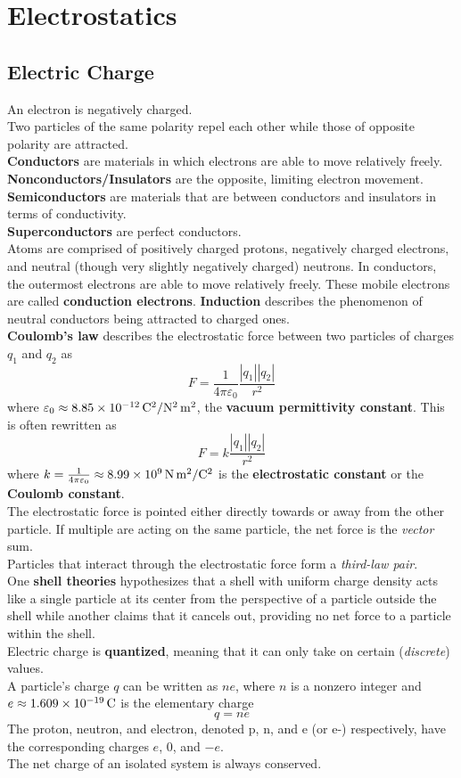 \documentclass[./Electricity and Magnetism.tex]{subfiles}
\begin{document}
	\section{Electrostatics}
		\subsection{Electric Charge}
			An electron is negatively charged. \\
			Two particles of the same polarity repel each other while those of opposite polarity are attracted. \\
			\textbf{Conductors} are materials in which electrons are able to move relatively freely. \textbf{Nonconductors/Insulators} are the opposite, limiting electron movement. \\
			\textbf{Semiconductors} are materials that are between conductors and insulators in terms of conductivity. \\
			\textbf{Superconductors} are perfect conductors. \\
			Atoms are comprised of positively charged protons, negatively charged electrons, and neutral (though very slightly negatively charged) neutrons. In conductors, the outermost electrons are able to move relatively freely. These mobile electrons are called \textbf{conduction electrons}.
			\textbf{Induction} describes the phenomenon of neutral conductors being attracted to charged ones. \\
			\textbf{Coulomb's law} describes the electrostatic force between two particles of charges \(q_1\) and \(q_2\) as
				\[F = \frac{1}{4\pi\varepsilon_0}\frac{|q_1||q_2|}{r^2} \tag{Coulomb's Law}\]
				where \(\varepsilon_0 \approx \SI[per-mode = fraction]{8.85d-12}{C^2/N^2.m^2}\), the \textbf{vacuum permittivity constant}. This is often rewritten as
				\[F = k\frac{|q_1||q_2|}{r^2} \tag{Coulomb's Law}\]
				where \(k = \frac{1}{4\pi\varepsilon_0} \approx \SI{8.99d9}{N.m^2/C^2}\) is the \textbf{electrostatic constant} or the \textbf{Coulomb constant}. \\
				The electrostatic force is pointed either directly towards or away from the other particle. If multiple are acting on the same particle, the net force is the \textit{vector} sum. \\
				Particles that interact through the electrostatic force form a \textit{third-law pair}. \\
			One \textbf{shell theories} hypothesizes that a shell with uniform charge density acts like a single particle at its center from the perspective of a particle outside the shell while another claims that it cancels out, providing no net force to a particle within the shell. \\
			Electric charge is \textbf{quantized}, meaning that it can only take on certain (\textit{discrete}) values. \\
			A particle's charge \(q\) can be written as \(ne\), where \(n\) is a nonzero integer and \(e \approx \SI{1.609d-19}{C}\) is the elementary charge
				\[q = ne\]
				The proton, neutron, and electron, denoted p, n, and e (or e-) respectively, have the corresponding charges \(e\), \(0\), and \(-e\). \\
			The net charge of an isolated system is always conserved.
\end{document}
